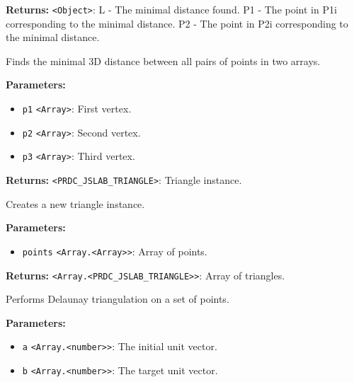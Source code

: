 \documentclass[12pt,a4paper]{article}
\begin{document}
\noindent \textbf{Returns:} \texttt{<Object>}: L  - The minimal distance found.
  P1 - The point in P1i corresponding to the minimal distance.
  P2 - The point in P2i corresponding to the minimal distance.

\noindent Finds the minimal 3D distance between all pairs of points in two arrays.

\vspace{5mm}
\noindent {}


\noindent \textbf{Parameters:}
\begin{itemize}
  \item \texttt{p1} \texttt{<Array>}: First vertex.
  \item \texttt{p2} \texttt{<Array>}: Second vertex.
  \item \texttt{p3} \texttt{<Array>}: Third vertex.
\end{itemize}

\noindent \textbf{Returns:} \texttt{<PRDC\_JSLAB\_TRIANGLE>}: Triangle instance.

\noindent Creates a new triangle instance.

\vspace{5mm}
\noindent {}


\noindent \textbf{Parameters:}
\begin{itemize}
  \item \texttt{points} \texttt{<Array.<Array>>}: Array of points.
\end{itemize}

\noindent \textbf{Returns:} \texttt{<Array.<PRDC\_JSLAB\_TRIANGLE>>}: Array of triangles.

\noindent Performs Delaunay triangulation on a set of points.

\vspace{5mm}
\noindent {}


\noindent \textbf{Parameters:}
\begin{itemize}
  \item \texttt{a} \texttt{<Array.<number>>}: The initial unit vector.
  \item \texttt{b} \texttt{<Array.<number>>}: The target unit vector.
\end{itemize}
\end{document}
